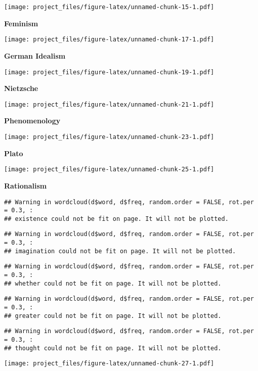 \documentclass[
]{article}
\begin{document}
\texttt{[image: project\_files/figure-latex/unnamed-chunk-15-1.pdf]}

\textbf{Feminism}

\texttt{[image: project\_files/figure-latex/unnamed-chunk-17-1.pdf]}

\textbf{German Idealism}

\texttt{[image: project\_files/figure-latex/unnamed-chunk-19-1.pdf]}

\textbf{Nietzsche}

\texttt{[image: project\_files/figure-latex/unnamed-chunk-21-1.pdf]}

\textbf{Phenomenology}

\texttt{[image: project\_files/figure-latex/unnamed-chunk-23-1.pdf]}

\textbf{Plato}

\texttt{[image: project\_files/figure-latex/unnamed-chunk-25-1.pdf]}

\textbf{Rationalism}

\begin{verbatim}
## Warning in wordcloud(d$word, d$freq, random.order = FALSE, rot.per = 0.3, :
## existence could not be fit on page. It will not be plotted.
\end{verbatim}

\begin{verbatim}
## Warning in wordcloud(d$word, d$freq, random.order = FALSE, rot.per = 0.3, :
## imagination could not be fit on page. It will not be plotted.
\end{verbatim}

\begin{verbatim}
## Warning in wordcloud(d$word, d$freq, random.order = FALSE, rot.per = 0.3, :
## whether could not be fit on page. It will not be plotted.
\end{verbatim}

\begin{verbatim}
## Warning in wordcloud(d$word, d$freq, random.order = FALSE, rot.per = 0.3, :
## greater could not be fit on page. It will not be plotted.
\end{verbatim}

\begin{verbatim}
## Warning in wordcloud(d$word, d$freq, random.order = FALSE, rot.per = 0.3, :
## thought could not be fit on page. It will not be plotted.
\end{verbatim}

\texttt{[image: project\_files/figure-latex/unnamed-chunk-27-1.pdf]}
\end{document}
